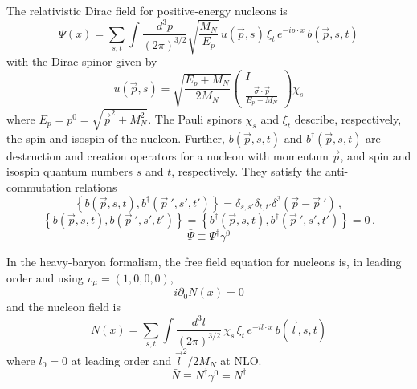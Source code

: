 \documentclass[sort&compress,preprint,3p]{elsarticle}
\begin{document}
The relativistic Dirac field for positive-energy nucleons is
\begin{equation}
\Psi(x)=\sum_{s,t} 
\int \frac{d^3p}{(2\pi)^{3/2}}
\sqrt{\frac{M_N}{E_p}} \, u(\vec p,s) \, \xi_t \, e^{-ip\cdot x} \,
b(\vec p,s,t)
\end{equation}
with the Dirac spinor given by
\begin{equation}
	u(\vec p,s) = \sqrt{\frac{E_p+M_N}{2M_N}} \left(
	\begin{array}{c}
	  I   \\
	\frac{\vec \sigma \cdot \vec p}{E_p+M_N}
	\end{array}
	\right)
        \chi_s
\end{equation}
where $E_p=p^0=\sqrt{{\vec p}^2+M_N^2}$.
The Pauli spinors $\chi_s$ and $\xi_t$ 
describe, respectively, the spin and isospin of the nucleon.
Further, 
$b(\vec p,s,t)$
and
$b^\dagger(\vec p,s,t)$
are destruction and creation operators for a nucleon with
momentum $\vec p$, and spin and isospin quantum numbers
$s$ and $t$, respectively. They satisfy the anti-commutation
relations
\begin{equation}
\left\{b(\vec p,s,t), b^\dagger({\vec p}~',s',t')\right\}=
\delta_{s,s'}\delta_{t,t'}\delta^3(\vec p-{\vec p}~')
\,, 
\end{equation}
\begin{equation}
\left\{b(\vec p,s,t), b({\vec p}~',s',t')\right\}=
\left\{b^\dagger(\vec p,s,t), b^\dagger({\vec p}~',s',t')\right\}=0
\,.
\end{equation}
\begin{equation}
{\bar \Psi} \equiv \Psi^\dagger \gamma^0
\end{equation}

In the heavy-baryon formalism, the free field equation for nucleons
is, in leading order and using $v_\mu=(1,0,0,0)$,
\begin{equation}
i\partial_0 N(x) = 0
\label{eq_HBfree}
\end{equation}
and the nucleon field is
\begin{equation}
N(x)=\sum_{s,t} \int \frac{d^3l}{(2\pi)^{3/2}}
\, \chi_s \, \xi_t \, e^{-il\cdot x} \,
b(\vec l,s,t)
\end{equation}
where $l_0=0$ at leading order and $\vec l^2/2M_N$ at NLO.
\begin{equation}
{\bar N} \equiv N^\dagger \gamma^0 = N^\dagger
\end{equation}
\end{document}

